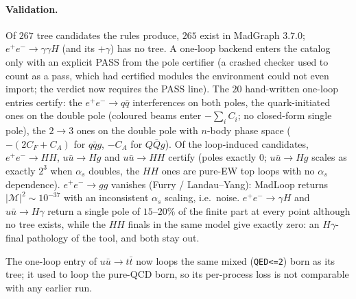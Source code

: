 \documentclass[11pt]{article}
\newcommand{\code}[1]{\texttt{#1}}
\begin{document}
\paragraph{Validation.} Of $267$ tree candidates the rules produce, $265$ exist in MadGraph
$3.7.0$; $e^+e^-\to\gamma\gamma H$ (and its $+\gamma$) has no tree. A one-loop backend enters
the catalog only with an explicit PASS from the pole certifier (a crashed checker used to
count as a pass, which had certified modules the environment could not even import; the
verdict now requires the PASS line). The $20$ hand-written one-loop entries certify: the
$e^+e^-\to q\bar q$ interferences on both poles, the quark-initiated ones on the double pole
(coloured beams enter $-\sum_i C_i$; no closed-form single pole), the $2\to3$ ones on the
double pole with $n$-body phase space ($-(2C_F+C_A)$ for $q\bar q g$, $-C_A$ for $Q\bar Q g$).
Of the loop-induced candidates, $e^+e^-\to HH$, $u\bar u\to Hg$ and $u\bar u\to HH$ certify
(poles exactly $0$; $u\bar u\to Hg$ scales as exactly $2^3$ when $\alpha_s$ doubles, the
$HH$ ones are pure-EW top loops with no $\alpha_s$ dependence). $e^+e^-\to gg$ vanishes
(Furry / Landau--Yang): MadLoop returns $|\mathcal M|^2\sim10^{-37}$ with an inconsistent
$\alpha_s$ scaling, i.e.\ noise. $e^+e^-\to\gamma H$ and $u\bar u\to H\gamma$ return a
single pole of $15$--$20\%$ of the finite part at every point although no tree exists, while
the $HH$ finals in the same model give exactly zero: an $H\gamma$-final pathology of the tool,
and both stay out.

The one-loop entry of $u\bar u\to t\bar t$ now loops the same mixed (\code{QED<=2}) born as its tree; it
used to loop the pure-QCD born, so its per-process loss is not comparable with any earlier run.
\end{document}
